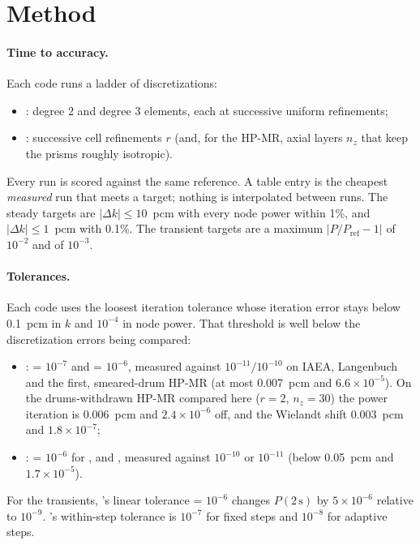 \section{Method}
\label{sec:method}

\paragraph{Time to accuracy.} Each code runs a ladder of discretizations:
\begin{itemize}
\item \ffn{}: degree 2 and degree 3 elements, each at successive uniform
  refinements;
\item \garnet{}: successive cell refinements $r$ (and, for the HP-MR, axial
  layers $n_z$ that keep the prisms roughly isotropic).
\end{itemize}
Every run is scored against the same reference. A table entry is the
cheapest \emph{measured} run that meets a target; nothing is interpolated
between runs. The steady targets are $|\Delta k| \le 10$~pcm with every node
power within 1\%, and $|\Delta k| \le 1$~pcm with 0.1\%. The transient targets
are a maximum $|P/P_\mathrm{ref} - 1|$ of $10^{-2}$ and of $10^{-3}$.

\paragraph{Tolerances.} Each code uses the loosest iteration tolerance whose
iteration error stays below 0.1~pcm in $k$ and $10^{-4}$ in node power. That
threshold is well below the discretization errors being compared:
\begin{itemize}
\item \garnet{}:  = $10^{-7}$ and  = $10^{-6}$,
  measured against $10^{-11}/10^{-10}$ on IAEA, Langenbuch and the first,
  smeared-drum HP-MR (at most 0.007~pcm and $6.6 \times 10^{-5}$). On the
  drums-withdrawn HP-MR compared here ($r=2$, $n_z=30$) the power iteration
  is 0.006~pcm and $2.4 \times 10^{-6}$ off, and the Wielandt shift
  0.003~pcm and $1.8 \times 10^{-7}$;
\item \ffn{}:  = $10^{-6}$ for ,
   and , measured against $10^{-10}$ or $10^{-11}$
  (below 0.05~pcm and $1.7 \times 10^{-5}$).
\end{itemize}
For the transients, \ffn's linear tolerance  =
$10^{-6}$ changes $P(2\,\mathrm{s})$ by $5 \times 10^{-6}$ relative to
$10^{-9}$. \garnet's within-step tolerance is $10^{-7}$ for fixed steps and
$10^{-8}$ for adaptive steps.

